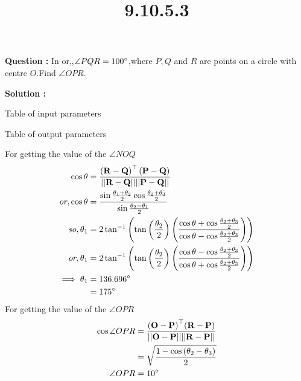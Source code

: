 \documentclass[12pt]{article}
\let\vec\mathbf
\providecommand{\brak}[1]{\ensuremath{\left(#1\right)}}
\providecommand{\norm}[1]{\ensuremath{\lvert|#1\rvert|}}
\begin{document}
\title{\textbf{9.10.5.3}}
\date{}
\maketitle
\textbf{Question :} In  or,,$\angle PQR = 100\degree$,where $P,Q$ and $R$ are points on a circle with centre $O$.Find $\angle OPR$.

\textbf{Solution :}
\begin{table}[H]
    \centering
    
    \caption{Table of input parameters}
    \label{tab:tab:1}
\end{table}

\begin{table}[H]
    \centering
    
  \caption{Table of output parameters}
    \label{tab:tab:2}
\end{table}

For getting the value of the $\angle NOQ$
\begin{align}
    \cos{\theta}&=\frac{\brak{\vec{R-Q}}^{\top}\brak{\vec{P-Q}}}{\vec{\norm{R-Q}\norm{P-Q}}}\\
    or,\cos{\theta}&=\frac{\sin{\frac{\theta_1+\theta_2}{2}}\cos{\frac{\theta_2+\theta_3}{2}}}{\sin{\frac{\theta_2-\theta_1}{2}}}\\
    so,\theta_1&=2\tan^{-1}\brak{\tan\brak{{\frac{\theta_2}{2}}}\brak{\frac{\cos{\theta}+\cos{\frac{\theta_2+\theta_3}{2}}}{\cos{\theta}-\cos{\frac{\theta_2+\theta_3}{2}}}}}\\
    or,\theta_1&=2\tan^{-1}\brak{\tan\brak{{\frac{\theta_2}{2}}}\brak{\frac{\cos{\theta}-\cos{\frac{\theta_2+\theta_3}{2}}}{\cos{\theta}+\cos{\frac{\theta_2+\theta_3}{2}}}}}\\
    \implies \theta_1&=136.696\degree\\
    &=175\degree
\end{align}
For getting the value of the $\angle OPR$
\begin{align}
    \cos{\angle OPR }&= \frac{\vec{\brak{O-P}}^{\top}\vec{\brak{R-P}}}{\vec{\norm{O-P}\norm{R-P}}}\\
&=\sqrt{\frac{1-\cos{\brak{\theta_2-\theta_3}}}{2}}\\
\angle OPR &= 10\degree
  \end{align}
\end{document}

